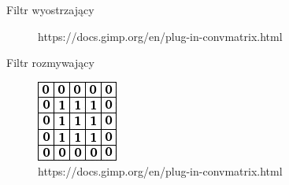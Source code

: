 \documentclass[xcolor=dvipsnames]{beamer}
\begin{document}
\begin{frame}{Filtr wyostrzający}
\begin{minipage}[t]{0.6\linewidth}
\begin{figure}
			\caption{https://docs.gimp.org/en/plug-in-convmatrix.html}
		\end{figure}
	\end{minipage}
\end{frame}

\begin{frame}{Filtr rozmywający}
	\begin{minipage}[t]{0.3\linewidth}
		\vfill
		\begin{figure}
			\includegraphics[width=\linewidth]{img/convolution-blur.png}
			\caption{https://docs.gimp.org/en/plug-in-convmatrix.html}
		\end{figure}	
	\end{minipage}%
	\hfill
	\begin{minipage}[t]{0.6\linewidth}
		\vfill
		\begin{figure}

\end{figure}
\end{minipage}
\end{frame}
\end{document}
